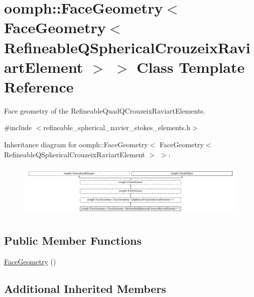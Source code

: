 \hypertarget{classoomph_1_1FaceGeometry_3_01FaceGeometry_3_01RefineableQSphericalCrouzeixRaviartElement_01_4_01_4}{}\section{oomph\+:\+:Face\+Geometry$<$ Face\+Geometry$<$ Refineable\+Q\+Spherical\+Crouzeix\+Raviart\+Element $>$ $>$ Class Template Reference}
\label{classoomph_1_1FaceGeometry_3_01FaceGeometry_3_01RefineableQSphericalCrouzeixRaviartElement_01_4_01_4}


Face geometry of the Refineable\+Quad\+Q\+Crouzeix\+Raviart\+Elements.  




{\ttfamily \#include $<$refineable\+\_\+spherical\+\_\+navier\+\_\+stokes\+\_\+elements.\+h$>$}

Inheritance diagram for oomph\+:\+:Face\+Geometry$<$ Face\+Geometry$<$ Refineable\+Q\+Spherical\+Crouzeix\+Raviart\+Element $>$ $>$\+:\begin{figure}[H]
\begin{center}
\leavevmode
\includegraphics[height=2.616822cm]{classoomph_1_1FaceGeometry_3_01FaceGeometry_3_01RefineableQSphericalCrouzeixRaviartElement_01_4_01_4}
\end{center}
\end{figure}
\subsection*{Public Member Functions}
\begin{DoxyCompactItemize}
\item 
\hyperlink{classoomph_1_1FaceGeometry_3_01FaceGeometry_3_01RefineableQSphericalCrouzeixRaviartElement_01_4_01_4_a7486a247a6bad47e29ab6cae2d9f14d4}{Face\+Geometry} ()
\end{DoxyCompactItemize}
\subsection*{Additional Inherited Members}


